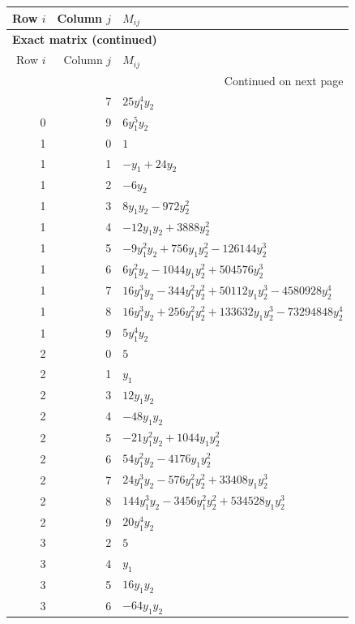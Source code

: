 \documentclass[10pt,a4paper]{article}
\begin{document}
{\small\setlength{\tabcolsep}{7pt}\begin{longtable}{rrp{125mm}}
\toprule Row $i$ & Column $j$ & $M_{ij}$\\\midrule\endfirsthead
\multicolumn{3}{l}{\textbf{Exact matrix (continued)}}\\
\toprule Row $i$ & Column $j$ & $M_{ij}$\\\midrule\endhead
\midrule\multicolumn{3}{r}{Continued on next page}\\\endfoot\bottomrule\endlastfoot
0 & 7 & $25 y_{1}^{4} y_{2}$\\
0 & 9 & $6 y_{1}^{5} y_{2}$\\
1 & 0 & $1$\\
1 & 1 & $- y_{1} + 24 y_{2}$\\
1 & 2 & $- 6 y_{2}$\\
1 & 3 & $8 y_{1} y_{2} - 972 y_{2}^{2}$\\
1 & 4 & $- 12 y_{1} y_{2} + 3888 y_{2}^{2}$\\
1 & 5 & $- 9 y_{1}^{2} y_{2} + 756 y_{1} y_{2}^{2} - 126144 y_{2}^{3}$\\
1 & 6 & $6 y_{1}^{2} y_{2} - 1044 y_{1} y_{2}^{2} + 504576 y_{2}^{3}$\\
1 & 7 & $16 y_{1}^{3} y_{2} - 344 y_{1}^{2} y_{2}^{2} + 50112 y_{1} y_{2}^{3} - 4580928 y_{2}^{4}$\\
1 & 8 & $16 y_{1}^{3} y_{2} + 256 y_{1}^{2} y_{2}^{2} + 133632 y_{1} y_{2}^{3} - 73294848 y_{2}^{4}$\\
1 & 9 & $5 y_{1}^{4} y_{2}$\\
2 & 0 & $5$\\
2 & 1 & $y_{1}$\\
2 & 3 & $12 y_{1} y_{2}$\\
2 & 4 & $- 48 y_{1} y_{2}$\\
2 & 5 & $- 21 y_{1}^{2} y_{2} + 1044 y_{1} y_{2}^{2}$\\
2 & 6 & $54 y_{1}^{2} y_{2} - 4176 y_{1} y_{2}^{2}$\\
2 & 7 & $24 y_{1}^{3} y_{2} - 576 y_{1}^{2} y_{2}^{2} + 33408 y_{1} y_{2}^{3}$\\
2 & 8 & $144 y_{1}^{3} y_{2} - 3456 y_{1}^{2} y_{2}^{2} + 534528 y_{1} y_{2}^{3}$\\
2 & 9 & $20 y_{1}^{4} y_{2}$\\
3 & 2 & $5$\\
3 & 4 & $y_{1}$\\
3 & 5 & $16 y_{1} y_{2}$\\
3 & 6 & $- 64 y_{1} y_{2}$\\

\end{longtable}}
\end{document}

